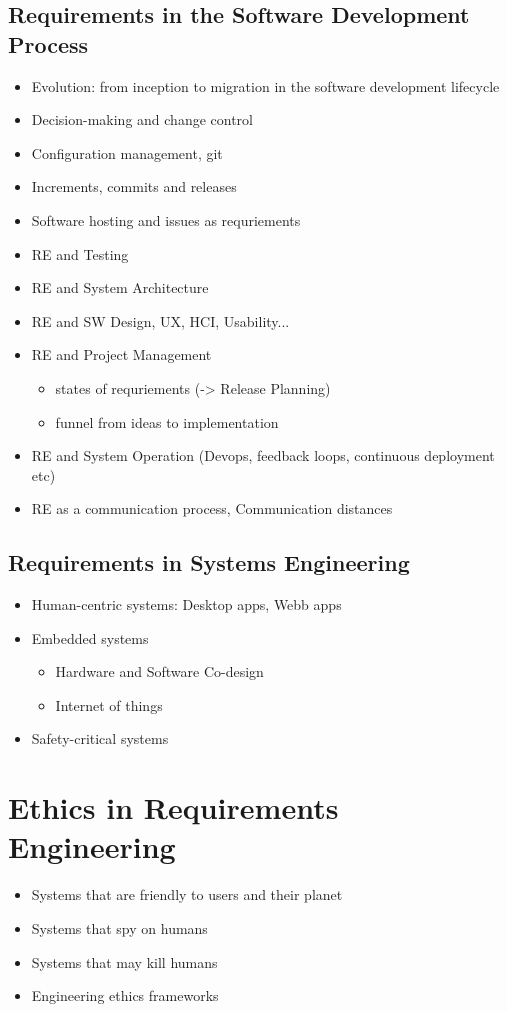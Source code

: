 \subsection{Requirements in the Software Development Process}

\begin{itemize}
  \item Evolution: from inception to migration in the software development lifecycle
  \item Decision-making and change control
  \item Configuration management, git
  \item Increments, commits and releases
  \item Software hosting and issues as requriements
  \item RE and Testing
  \item RE and System Architecture
  \item RE and SW Design, UX, HCI, Usability...
  \item RE and Project Management
  \begin{itemize}
    \item states of requriements (-> Release Planning)
    \item funnel from ideas to implementation
  \end{itemize}
   \item RE and System Operation (Devops, feedback loops, continuous deployment etc)
   \item RE as a communication process, Communication distances
\end{itemize}

\subsection{Requirements in Systems Engineering}

\begin{itemize}
  \item Human-centric systems: Desktop apps, Webb apps
  \item Embedded systems
  \begin{itemize}
    \item Hardware and Software Co-design
    \item Internet of things
  \end{itemize}
  \item Safety-critical systems
\end{itemize}

\section{Ethics in Requirements Engineering}

\begin{itemize}
  \item Systems that are friendly to users and their planet
  \item Systems that spy on humans
  \item Systems that may kill humans
  \item Engineering ethics frameworks
\end{itemize}
